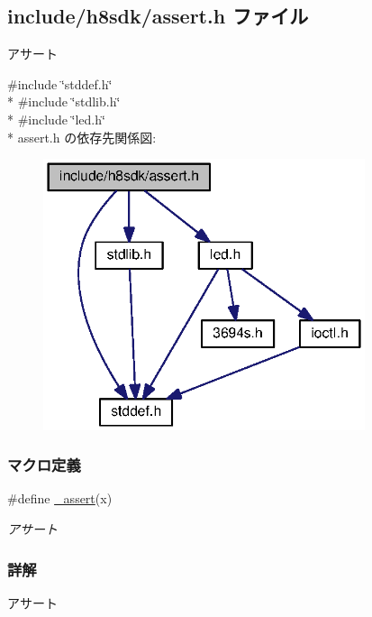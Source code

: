 \subsection{include/h8sdk/assert.h ファイル}
\label{assert_8h}


アサート  


{\ttfamily \#include \char`\"{}stddef.\+h\char`\"{}}\\*
{\ttfamily \#include \char`\"{}stdlib.\+h\char`\"{}}\\*
{\ttfamily \#include \char`\"{}led.\+h\char`\"{}}\\*
assert.\+h の依存先関係図\+:
\nopagebreak
\begin{figure}[H]
\begin{center}
\leavevmode
\includegraphics[width=268pt]{d8/dd7/assert_8h__incl}
\end{center}
\end{figure}
\subsubsection*{マクロ定義}
\begin{DoxyCompactItemize}
\item 
\#define \hyperlink{assert_8h_a981c85fb63ead3e920cfe332abed4099_a981c85fb63ead3e920cfe332abed4099}{\+\_\+assert}(x)                                                        
\begin{DoxyCompactList}\small\item\em アサート \end{DoxyCompactList}\end{DoxyCompactItemize}


\subsubsection{詳解}
アサート 

